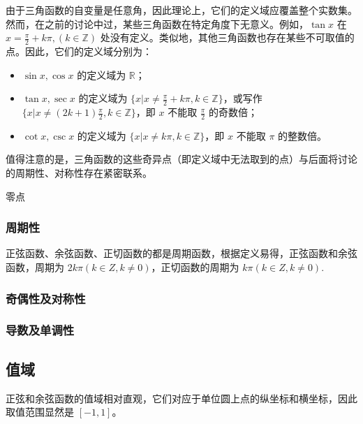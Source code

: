 由于三角函数的自变量是任意角，因此理论上，它们的定义域应覆盖整个实数集。然而，在之前的讨论中过，某些三角函数在特定角度下无意义。例如，$\tan x$ 在 $\displaystyle x=\frac{\pi}{2}+k\pi, (k\in\mathbb{Z})$ 处没有定义。类似地，其他三角函数也存在某些不可取值的点。因此，它们的定义域分别为：
\begin{itemize}
\item $\sin x,\cos x$ 的定义域为 $\mathbb{R}$；
\item $\tan x,\sec x$ 的定义域为 $\displaystyle\{x|x\neq\frac{\pi}{2}+k\pi,k\in\mathbb{Z}\}$，或写作$\displaystyle\{x|x\neq(2k+1)\frac{\pi}{2},k\in\mathbb{Z}\}$，即 $x$ 不能取 $\frac{\pi}{2}$ 的奇数倍；
\item $\cot x,\csc x$ 的定义域为 $\displaystyle\{x|x\neq k\pi,k\in\mathbb{Z}\}$，即 $x$ 不能取 $\pi$ 的整数倍。
\end{itemize}
值得注意的是，三角函数的这些奇异点（即定义域中无法取到的点）与后面将讨论的周期性、对称性存在紧密联系。

零点

\subsubsection{周期性}

正弦函数、余弦函数、正切函数的都是周期函数，根据定义易得，正弦函数和余弦函数，周期为 $2k\pi(k\in Z,k\neq0)$，正切函数的周期为 $k\pi(k\in Z,k\neq0)$.


\subsubsection{奇偶性及对称性}

\subsubsection{导数及单调性}

\subsection{值域}

正弦和余弦函数的值域相对直观，它们对应于单位圆上点的纵坐标和横坐标，因此取值范围显然是 $[-1,1]$。


